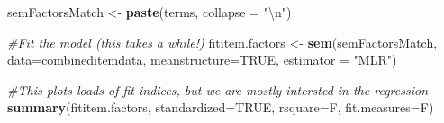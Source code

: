 \documentclass[]{article}
\newenvironment{Shaded}{\begin{snugshade}}{\end{snugshade}}
\newcommand{\KeywordTok}[1]{\textcolor[rgb]{0.13,0.29,0.53}{\textbf{#1}}}
\newcommand{\DataTypeTok}[1]{\textcolor[rgb]{0.13,0.29,0.53}{#1}}
\newcommand{\CharTok}[1]{\textcolor[rgb]{0.31,0.60,0.02}{#1}}
\newcommand{\StringTok}[1]{\textcolor[rgb]{0.31,0.60,0.02}{#1}}
\newcommand{\CommentTok}[1]{\textcolor[rgb]{0.56,0.35,0.01}{\textit{#1}}}
\newcommand{\OtherTok}[1]{\textcolor[rgb]{0.56,0.35,0.01}{#1}}
\newcommand{\NormalTok}[1]{#1}
\begin{document}
\begin{Shaded}
\begin{Highlighting}[]
\NormalTok{semFactorsMatch <-}\StringTok{ }\KeywordTok{paste}\NormalTok{(terms, }\DataTypeTok{collapse =} \StringTok{"}\CharTok{\textbackslash{}n}\StringTok{"}\NormalTok{)}

\CommentTok{#Fit the model (this takes a while!)}
\NormalTok{fititem.factors <-}\StringTok{ }\KeywordTok{sem}\NormalTok{(semFactorsMatch, }\DataTypeTok{data=}\NormalTok{combineditemdata, }\DataTypeTok{meanstructure=}\OtherTok{TRUE}\NormalTok{,  }\DataTypeTok{estimator =} \StringTok{"MLR"}\NormalTok{)}

\CommentTok{#This plots loads of fit indices, but we are mostly intersted in the regression}
\KeywordTok{summary}\NormalTok{(fititem.factors, }\DataTypeTok{standardized=}\OtherTok{TRUE}\NormalTok{, }\DataTypeTok{rsquare=}\NormalTok{F, }\DataTypeTok{fit.measures=}\NormalTok{F)}
\end{Highlighting}
\end{Shaded}
\end{document}
